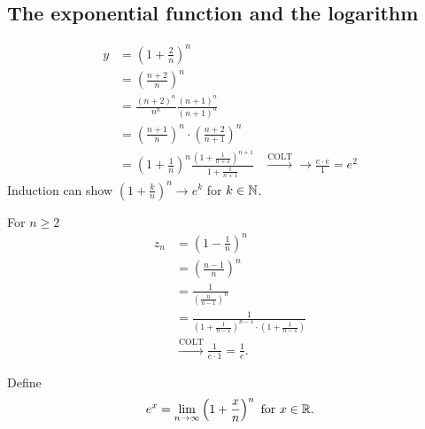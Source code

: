 \documentclass[10pt, a4paper]{article}
\begin{document}
\subsection{The exponential function and the logarithm}
\begin{example}
    \begin{align*}
        y &= \left(1 + \frac{2}{n}\right) ^ n \\
        &= \left(\frac{n + 2}{n}\right) ^ n \\
        &= \frac{(n + 2) ^ n}{n ^ n}\frac{(n + 1) ^ n}{(n + 1) ^ n} \\
        &= \left(\frac{n + 1}{n}\right) ^ n \cdot \left(\frac{n + 2}{n + 1}\right) ^ n \\
        &= \left(1 + \frac{1}{n}\right) ^ n\frac{\left(1 + \frac{1}{n + 1}\right) ^ {n + 1}}{1 + \frac{1}{n + 1}}
        &\xrightarrow{\text{COLT}}\rightarrow\frac{e \cdot e}{1} = e ^ 2
    \end{align*}
    Induction can show $\left(1 + \frac{k}{n}\right) ^ n \rightarrow e ^ k$ for $k \in \mathbb{N}$.

    For $n \geq 2$
    \begin{align*}
        z_n &= \left(1 - \frac{1}{n}\right) ^ n \\
        &= \left(\frac{n - 1}{n}\right) ^ n \\
        &= \frac{1}{\left(\frac{n}{n - 1}\right) ^ n} \\
        &= \frac{1}{\left(1 + \frac{1}{n - 1}\right) ^ {n - 1}\cdot\left(1 + \frac{1}{n - 1}\right)} \\
        &\xrightarrow{\text{COLT}}\frac{1}{e \cdot 1} = \frac{1}{e}.
    \end{align*}
\end{example}

Define
\[
e ^ x = \lim_{n \rightarrow \infty}\left(1 + \frac{x}{n}\right) ^ n\text{ for } x \in \mathbb{R}.
\]
\end{document}
